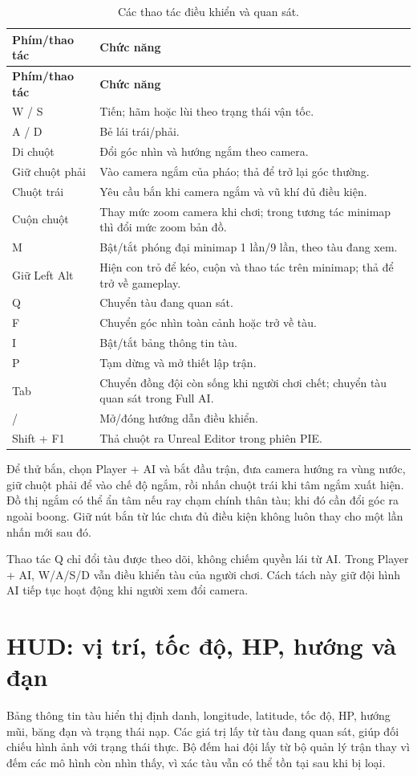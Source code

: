 \documentclass[11pt,a4paper,oneside]{report}
\begin{document}
\begin{longtable}{@{}p{30mm}p{115mm}@{}}
\caption{Các thao tác điều khiển và quan sát.}\\
\toprule\textbf{Phím/thao tác}&\textbf{Chức năng}\\\midrule\endfirsthead
\toprule\textbf{Phím/thao tác}&\textbf{Chức năng}\\\midrule\endhead
W / S&Tiến; hãm hoặc lùi theo trạng thái vận tốc.\\
A / D&Bẻ lái trái/phải.\\
Di chuột&Đổi góc nhìn và hướng ngắm theo camera.\\
Giữ chuột phải&Vào camera ngắm của pháo; thả để trở lại góc thường.\\
Chuột trái&Yêu cầu bắn khi camera ngắm và vũ khí đủ điều kiện.\\
Cuộn chuột&Thay mức zoom camera khi chơi; trong tương tác minimap thì đổi mức zoom bản đồ.\\
M&Bật/tắt phóng đại minimap 1 lần/9 lần, theo tàu đang xem.\\
Giữ Left Alt&Hiện con trỏ để kéo, cuộn và thao tác trên minimap; thả để trở về gameplay.\\
Q&Chuyển tàu đang quan sát.\\
F&Chuyển góc nhìn toàn cảnh hoặc trở về tàu.\\
I&Bật/tắt bảng thông tin tàu.\\
P&Tạm dừng và mở thiết lập trận.\\
Tab&Chuyển đồng đội còn sống khi người chơi chết; chuyển tàu quan sát trong Full AI.\\
/&Mở/đóng hướng dẫn điều khiển.\\
Shift + F1&Thả chuột ra Unreal Editor trong phiên PIE.\\\bottomrule
\end{longtable}

Để thử bắn, chọn Player + AI và bắt đầu trận, đưa camera hướng ra vùng nước, giữ chuột phải để vào chế độ ngắm, rồi nhấn chuột trái khi tâm ngắm xuất hiện. Đồ thị ngắm có thể ẩn tâm nếu ray chạm chính thân tàu; khi đó cần đổi góc ra ngoài boong. Giữ nút bắn từ lúc chưa đủ điều kiện không luôn thay cho một lần nhấn mới sau đó.

Thao tác Q chỉ đổi tàu được theo dõi, không chiếm quyền lái từ AI. Trong Player + AI, W/A/S/D vẫn điều khiển tàu của người chơi. Cách tách này giữ đội hình AI tiếp tục hoạt động khi người xem đổi camera.

\section{HUD: vị trí, tốc độ, HP, hướng và đạn}
Bảng thông tin tàu hiển thị định danh, longitude, latitude, tốc độ, HP, hướng mũi, băng đạn và trạng thái nạp. Các giá trị lấy từ tàu đang quan sát, giúp đối chiếu hình ảnh với trạng thái thực. Bộ đếm hai đội lấy từ bộ quản lý trận thay vì đếm các mô hình còn nhìn thấy, vì xác tàu vẫn có thể tồn tại sau khi bị loại.
\end{document}
